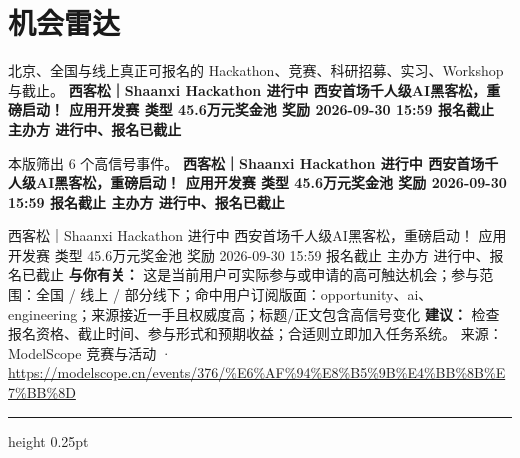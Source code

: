 \documentclass[10.5pt]{ctexart}
\begin{document}
\section*{机会雷达}
{\color{ormuted} 北京、全国与线上真正可报名的 Hackathon、竞赛、科研招募、实习、Workshop 与截止。}
\vspace{2mm}
{\LARGE\bfseries 西客松｜Shaanxi Hackathon 进行中 西安首场千人级AI黑客松，重磅启动！ 应用开发赛 类型 45.6万元奖金池 奖励 2026-09-30 15:59 报名截止 主办方 进行中、报名已截止}\par
\vspace{1mm}
{\color{ormuted} 本版筛出 6 个高信号事件。}
\vspace{3mm}
{\Large\bfseries 西客松｜Shaanxi Hackathon 进行中 西安首场千人级AI黑客松，重磅启动！ 应用开发赛 类型 45.6万元奖金池 奖励 2026-09-30 15:59 报名截止 主办方 进行中、报名已截止}\par
西客松｜Shaanxi Hackathon 进行中 西安首场千人级AI黑客松，重磅启动！ 应用开发赛 类型 45.6万元奖金池 奖励 2026-09-30 15:59 报名截止 主办方 进行中、报名已截止
\textbf{与你有关：} 这是当前用户可实际参与或申请的高可触达机会；参与范围：全国 / 线上 / 部分线下；命中用户订阅版面：opportunity、ai、engineering；来源接近一手且权威度高；标题/正文包含高信号变化
\textbf{建议：} 检查报名资格、截止时间、参与形式和预期收益；合适则立即加入任务系统。
{\footnotesize\color{ormuted} 来源：ModelScope 竞赛与活动 · \url{https://modelscope.cn/events/376/%E6%AF%94%E8%B5%9B%E4%BB%8B%E7%BB%8D}}
\vspace{4mm}
\hrule height 0.25pt
\vspace{3mm}
\end{document}
